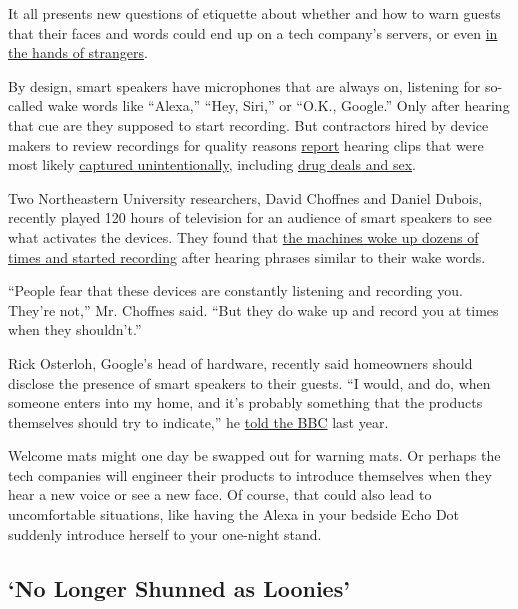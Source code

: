 It all presents new questions of etiquette about whether and how to warn
guests that their faces and words could end up on a tech company's
servers, or even
\href{https://www.nytimes.com/2019/08/21/technology/personaltech/alexa-siri-google-assistant-listen.html}{in
the hands of strangers}.

By design, smart speakers have microphones that are always on, listening
for so-called wake words like ``Alexa,'' ``Hey, Siri,'' or ``O.K.,
Google.'' Only after hearing that cue are they supposed to start
recording. But contractors hired by device makers to review recordings
for quality reasons
\href{https://www.vrt.be/vrtnws/en/2019/07/10/google-employees-are-eavesdropping-even-in-flemish-living-rooms/}{report}
hearing clips that were most likely
\href{https://www.bloomberg.com/news/articles/2019-04-10/is-anyone-listening-to-you-on-alexa-a-global-team-reviews-audio}{captured
unintentionally}, including
\href{https://www.theguardian.com/technology/2019/jul/26/apple-contractors-regularly-hear-confidential-details-on-siri-recordings}{drug
deals and sex}.

Two Northeastern University researchers, David Choffnes and Daniel
Dubois, recently played 120 hours of television for an audience of smart
speakers to see what activates the devices. They found that
\href{https://moniotrlab.ccis.neu.edu/smart-speakers-study/}{the
machines woke up dozens of times and started recording} after hearing
phrases similar to their wake words.

``People fear that these devices are constantly listening and recording
you. They're not,'' Mr. Choffnes said. ``But they do wake up and record
you at times when they shouldn't.''

Rick Osterloh, Google's head of hardware, recently said homeowners
should disclose the presence of smart speakers to their guests. ``I
would, and do, when someone enters into my home, and it's probably
something that the products themselves should try to indicate,'' he
\href{https://www.bbc.com/news/technology-50048144}{told the BBC} last
year.

Welcome mats might one day be swapped out for warning mats. Or perhaps
the tech companies will engineer their products to introduce themselves
when they hear a new voice or see a new face. Of course, that could also
lead to uncomfortable situations, like having the Alexa in your bedside
Echo Dot suddenly introduce herself to your one-night stand.

\hypertarget{no-longer-shunned-as-loonies}{%
\subsection{`No Longer Shunned as
Loonies'}\label{no-longer-shunned-as-loonies}}


